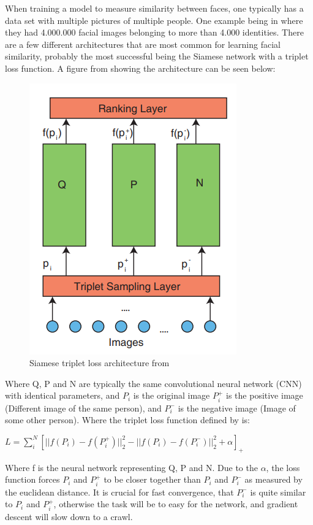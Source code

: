 When training a model to measure similarity between faces, one typically has a data set with multiple pictures of multiple people. One example being in \cite{Deep_Face} where they had 4.000.000 facial images belonging to more than 4.000 identities. There are a few different architectures that are most common for learning facial similarity, probably the most successful being the Siamese network with a triplet loss function\cite{Deep_Face}\cite{UltimateAccuracy}\cite{FaceNet}. A figure from \cite{Learning_Fine_grained} showing the architecture can be seen below:
\begin{figure}[H]
    \centering
    \includegraphics[width=0.50\linewidth,origin=c]{Report/Pictures/LossFuntion/Siamese.png}
    \caption{Siamese triplet loss architecture from\cite{Learning_Fine_grained}}
    \label{Siamese}
\end{figure}
Where Q, P and N are typically the same convolutional neural network (CNN) with identical parameters, and $P_i$ is the original image $P_i^+$ is the positive image (Different image of the same person), and $P_i^-$ is the negative image (Image of some other person)\cite{FaceNet}\cite{Learning_Fine_grained}. Where the triplet loss function defined by is:
\begin{center}
    $L = \sum_i^N[||f(P_i)-f(P_i^+)||_2^2-||f(P_i)-f(P_i^-)||_2^2+\alpha]_+$
\end{center}
Where f is the neural network representing Q, P and N. Due to the $\alpha$, the loss function forces $P_i$ and $P_i^+$ to be closer together than $P_i$ and $P_i^-$ as measured by the euclidean distance\cite{FaceNet}\cite{Learning_Fine_grained}. 
It is crucial for fast convergence, that $P_i^-$ is quite similar to $P_i$ and $P_i^+$, otherwise the task will be to easy for the network, and gradient descent will slow down to a crawl\cite{FaceNet}.

